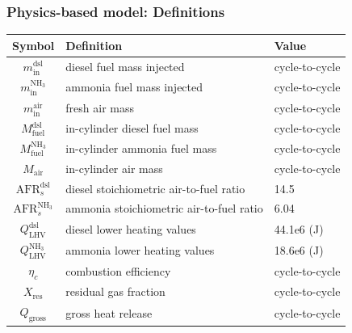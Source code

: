 \documentclass[aspectratio=169, 10pt]{beamer}
\newcommand{\mdies}{m_{\text{in}}^{\text{dsl}}}
\newcommand{\mammo}{m_{\text{in}}^{\text{NH$_3$}}}
\newcommand{\mair}{m_{\text{in}}^{\text{air}}}
\newcommand{\Mdies}{M_{\text{fuel}}^{\text{dsl}}}
\newcommand{\Mammo}{M_{\text{fuel}}^{\text{NH$_3$}}}
\newcommand{\Mair}{M_{\text{air}}}
\newcommand{\AFRds}{\text{AFR}_s^{\text{dsl}}}
\newcommand{\AFRas}{\text{AFR}_s^{\text{NH$_3$}}}
\newcommand{\Qlhvd}{Q_{\text{LHV}}^{\text{dsl}}}
\newcommand{\Qlhva}{Q_{\text{LHV}}^{\text{NH$_3$}}}
\newcommand{\Xresi}{X_{\text{res}}}
\newcommand{\Qgros}{Q_{\text{gross}}}
\begin{document}
%
%

\begin{frame}
\frametitle{Physics-based model: Definitions}

\begin{center}
    \begin{tabular}{@{}cll@{}}
        \toprule
        Symbol & Definition & Value \\
        \midrule
        $\mdies$ & diesel fuel mass injected & cycle-to-cycle\\
        $\mammo$ & ammonia fuel mass injected & cycle-to-cycle\\
        $\mair$ & fresh air mass & cycle-to-cycle\\
        $\Mdies$ & in-cylinder diesel fuel mass & cycle-to-cycle\\
        $\Mammo$ &  in-cylinder ammonia fuel mass & cycle-to-cycle\\
        $\Mair$ &  in-cylinder air mass & cycle-to-cycle\\
        $\AFRds$ &  diesel stoichiometric air-to-fuel ratio & 14.5 \\
        $\AFRas$ &  ammonia stoichiometric air-to-fuel ratio & 6.04 \\
        $\Qlhvd$ &  diesel lower heating values & 44.1e6 (J)\\
        $\Qlhva$ &  ammonia lower heating values & 18.6e6 (J)\\
		$\eta_c$ &  combustion efficiency & cycle-to-cycle\\
        $\Xresi$ & residual gas fraction & cycle-to-cycle\\
        $\Qgros$ & gross heat release & cycle-to-cycle\\
        \bottomrule
    \end{tabular}
\end{center}

\end{frame}
\end{document}
